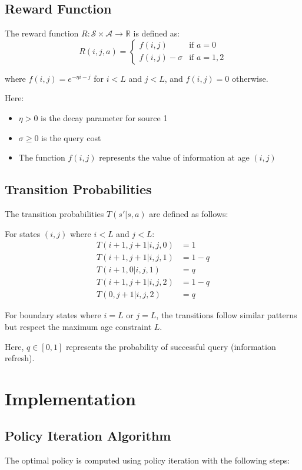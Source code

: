 \documentclass[12pt]{article}
\begin{document}
\subsection{Reward Function}
The reward function $R: \mathcal{S} \times \mathcal{A} \rightarrow \mathbb{R}$ is defined as:
$$R(i, j, a) = \begin{cases}
f(i, j) & \text{if } a = 0 \\
f(i, j) - \sigma & \text{if } a = 1, 2
\end{cases}$$

where $f(i, j) = e^{-\eta i - j}$ for $i < L$ and $j < L$, and $f(i, j) = 0$ otherwise.

Here:
\begin{itemize}
    \item $\eta > 0$ is the decay parameter for source 1
    \item $\sigma \geq 0$ is the query cost
    \item The function $f(i, j)$ represents the value of information at age $(i, j)$
\end{itemize}

\subsection{Transition Probabilities}
The transition probabilities $T(s'|s, a)$ are defined as follows:

For states $(i, j)$ where $i < L$ and $j < L$:
\begin{align}
T(i+1, j+1 | i, j, 0) &= 1 \\
T(i+1, j+1 | i, j, 1) &= 1 - q \\
T(i+1, 0 | i, j, 1) &= q \\
T(i+1, j+1 | i, j, 2) &= 1 - q \\
T(0, j+1 | i, j, 2) &= q
\end{align}

For boundary states where $i = L$ or $j = L$, the transitions follow similar patterns but respect the maximum age constraint $L$.

Here, $q \in [0, 1]$ represents the probability of successful query (information refresh).

\section{Implementation}

\subsection{Policy Iteration Algorithm}
The optimal policy is computed using policy iteration with the following steps:
\end{document}
